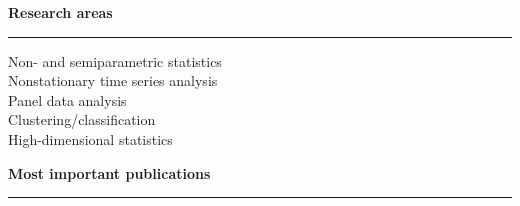\documentclass[a4paper,12pt]{article}
\begin{document}


{\normalsize \textbf{Research areas}} \\[-0.2cm]
\rule{\textwidth}{0.2pt}

\vspace{0.3cm}

Non- and semiparametric statistics \\
Nonstationary time series analysis \\ 
Panel data analysis \\
Clustering/classification \\
High-dimensional statistics \\
\vspace{0.5cm}


{\normalsize \textbf{Most important publications}} \\[-0.2cm]
\rule{\textwidth}{0.2pt}
\end{document}
